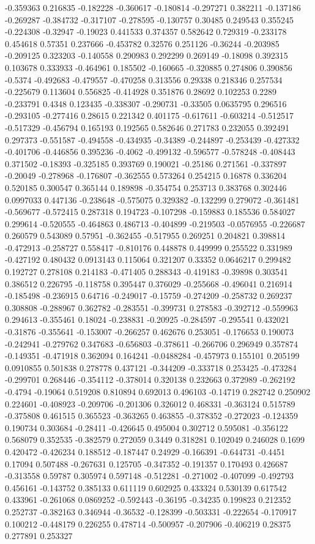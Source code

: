 -0.359363 0.216835 -0.182228 -0.360617 -0.180814 -0.297271 0.382211 -0.137186 -0.269287 -0.384732 -0.317107 -0.278595 -0.130757 0.30485 0.249543 0.355245 -0.224308 -0.32947 -0.19023 0.441533 0.374357 0.582642 0.729319 -0.233178 0.454618 0.57351 0.237666 -0.453782 0.32576 0.251126 -0.36244 -0.203985 -0.209125 0.323203 -0.140558 0.290983 0.292299 0.269149 -0.18098 0.392315 0.103678 0.333933 -0.464961 0.185502 -0.160665 -0.320885 0.274806 0.390856 -0.5374 -0.492683 -0.479557 -0.470258 0.313556 0.29338 0.218346 0.257534 -0.225679 0.113604 0.556825 -0.414928 0.351876 0.28692 0.102253 0.2289 -0.233791 0.4348 0.123435 -0.338307 -0.290731 -0.33505 0.0635795 0.296516 -0.293105 -0.277416 0.28615 0.221342 0.401175 -0.617611 -0.603214 -0.512517 -0.517329 -0.456794 0.165193 0.192565 0.582646 0.271783 0.232055 0.392491 0.297373 -0.551587 -0.494558 -0.434935 -0.34389 -0.244897 -0.253439 -0.427332 -0.401706 -0.446856 0.395236 -0.4062 -0.499132 -0.596577 -0.578248 -0.408443 0.371502 -0.18393 -0.325185 0.393769 0.190021 -0.25186 0.271561 -0.337897 -0.20049 -0.278968 -0.176807 -0.362555 0.573264 0.254215 0.16878 0.336204 0.520185 0.300547 0.365144 0.189898 -0.354754 0.253713 0.383768 0.302446 0.0997033 0.447136 -0.238648 -0.575075 0.329382 -0.132299 0.279072 -0.361481 -0.569677 -0.572415 0.287318 0.194723 -0.107298 -0.159883 0.185536 0.584027 0.299614 -0.520555 -0.464863 0.486713 -0.404899 -0.219503 -0.0576955 -0.226687 0.260579 0.543089 0.57951 -0.362455 -0.517955 0.269251 0.204821 0.398814 -0.472913 -0.258727 0.558417 -0.810176 0.448878 0.449999 0.255522 0.331989 -0.427192 0.480432 0.0913143 0.115064 0.321207 0.33352 0.0646217 0.299482 0.192727 0.278108 0.214183 -0.471405 0.288343 -0.419183 -0.39898 0.303541 0.386512 0.226795 -0.118758 0.395447 0.376029 -0.255668 -0.496041 0.216914 -0.185498 -0.236915 0.64716 -0.249017 -0.15759 -0.274209 -0.258732 0.269237 0.308808 -0.288967 0.362782 -0.283551 -0.399731 0.278583 -0.392712 -0.559963 0.294613 -0.355461 0.18024 -0.238831 -0.20925 -0.284597 -0.295541 0.432021 -0.31876 -0.355641 -0.153007 -0.266257 0.462676 0.253051 -0.176653 0.190073 -0.242941 -0.279762 0.347683 -0.656803 -0.378611 -0.266706 0.296949 0.357874 -0.149351 -0.471918 0.362094 0.164241 -0.0488284 -0.457973 0.155101 0.205199 0.0910855 0.501838 0.278778 0.437121 -0.344209 -0.333718 0.253425 -0.473284 -0.299701 0.268446 -0.354112 -0.378014 0.320138 0.232663 0.372989 -0.262192 -0.4794 -0.19064 0.519208 0.810894 0.692013 0.496103 -0.14719 0.282742 0.250902 0.224601 -0.408923 -0.209706 -0.201306 0.326012 0.468331 -0.363124 0.515789 -0.375808 0.461515 0.365523 -0.363265 0.463855 -0.378352 -0.272023 -0.124359 0.190734 0.303684 -0.28411 -0.426645 0.495004 0.302712 0.595081 -0.356122 0.568079 0.352535 -0.382579 0.272059 0.3449 0.318281 0.102049 0.246028 0.1699 0.420472 -0.426234 0.188512 -0.187447 0.24929 -0.166391 -0.644731 -0.4451 0.17094 0.507488 -0.267631 0.125705 -0.347352 -0.191357 0.170493 0.426687 -0.313558 0.59787 0.305974 0.597148 -0.512281 -0.271002 -0.407099 -0.492793 0.456161 -0.143752 0.385133 0.611119 0.602925 0.433324 0.530139 0.617542 0.433961 -0.261068 0.0869252 -0.592443 -0.36195 -0.34235 0.199823 0.212352 0.252737 -0.382163 0.346944 -0.36532 -0.128399 -0.503331 -0.222654 -0.170917 0.100212 -0.448179 0.226255 0.478714 -0.500957 -0.207906 -0.406219 0.28375 0.277891 0.253327 